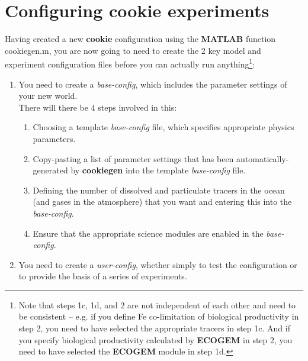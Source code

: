 %
%

\newpage

\section{Configuring cookie experiments}\label{sec:configuring_cookie_experiments}


Having created a new \textbf{cookie} configuration using the \textbf{MATLAB} function \textsf{\footnotesize cookiegen.m}, you are now going to need to create the 2 key model and experiment configuration files before you can actually run anything\footnote{Note that steps 1c, 1d, and 2 are not independent of each other and need to be consistent -- e.g. if you define Fe co-limitation of biological productivity in step 2, you need to have selected the appropriate tracers in step 1c. And if you specify biological productivity calculated by \textbf{ECOGEM} in step 2, you need to have selected the \textbf{ECOGEM} module in step 1d.}:

\begin{enumerate}[noitemsep]
\vspace{1mm}
\item You need to create a \textit{base-config}, which includes the parameter settings of your new world.
\\There will there be 4 steps involved in this:
\begin{enumerate}[noitemsep]
\item Choosing a template \textit{base-config} file, which specifies appropriate physics parameters.
\item Copy-pasting a list of parameter settings that has been automatically-generated by \textbf{cookiegen} into the template\textit{ base-config} file.
\item Defining the number of dissolved and particulate tracers in the ocean (and gases in the atmosphere) that you want and entering this into the \textit{base-config}.
\item Ensure that the appropriate science modules are enabled in the \textit{base-config}.
\end{enumerate}
\vspace{1mm}
\item You need to create a \textit{user-config}, whether simply to test the configuration or to provide the basis of a series of experiments.
\end{enumerate}
\vspace{1mm}

